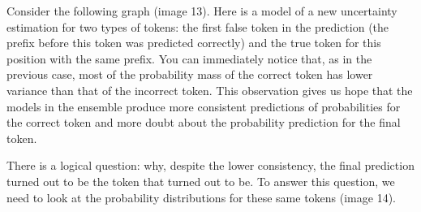 \documentclass[a4paper,14pt]{extarticle}
\begin{document}
	\begin{figure}[t]
	\end{figure}
	Consider the following graph (image 13). Here is a model of a new uncertainty estimation for two types of tokens: the first false token in the prediction (the prefix before this token was predicted correctly) and the true token for this position with the same prefix. You can immediately notice that, as in the previous case, most of the probability mass of the correct token has lower variance than that of the incorrect token. This observation gives us hope that the models in the ensemble produce more consistent predictions of probabilities for the correct token and more doubt about the probability prediction for the final token.

	There is a logical question: why, despite the lower consistency, the final prediction turned out to be the token that turned out to be. To answer this question, we need to look at the probability distributions for these same tokens (image 14).
	
	\begin{figure}[t]
	\end{figure}
	
\end{document}
